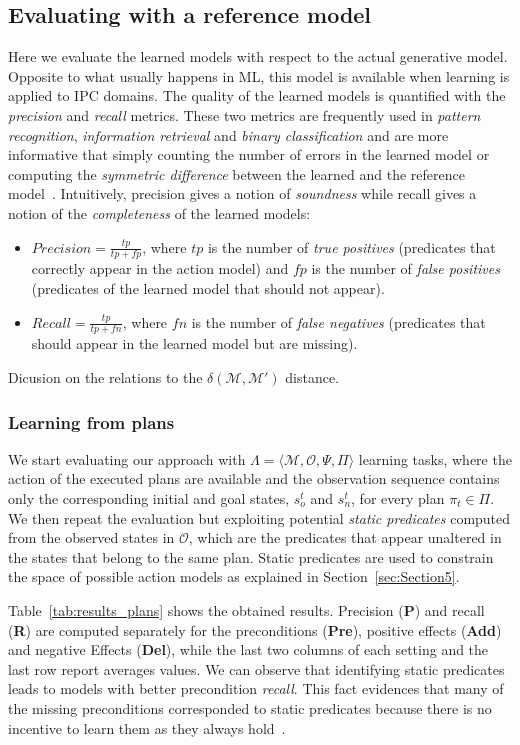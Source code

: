 \documentclass[3p,times]{elsarticle}
\newcommand{\tup}[1]{{\langle #1 \rangle}}
\begin{document}
\subsection{Evaluating with a reference model}
Here we evaluate the learned models with respect to the actual generative model. Opposite to what usually happens in ML, this model is available when learning is applied to IPC domains. The quality of the learned models is quantified with the {\em precision} and {\em recall} metrics. These two metrics are frequently used in {\em pattern recognition}, {\em information retrieval} and {\em binary classification} and are more informative that simply counting the number of errors in the learned model or computing the {\em symmetric difference} between the learned and the reference model~\cite{davis2006relationship}. Intuitively, precision gives a notion of {\em soundness} while recall gives a notion of the {\em completeness} of the learned models:
\begin{itemize}
\item $Precision=\frac{tp}{tp+fp}$, where $tp$ is the number of {\em true positives} (predicates that correctly appear in the action model) and $fp$ is the number of {\em false positives} (predicates of the learned model that should not appear).
\item $Recall=\frac{tp}{tp+fn}$, where $fn$ is the number of {\em false negatives} (predicates that should appear in the learned model but are missing).
\end{itemize}

Dicusion on the relations to the $\delta(\mathcal{M},\mathcal{M}')$ distance.


\subsubsection{Learning from plans}
We start evaluating our approach with $\Lambda=\tup{\mathcal{M},\mathcal{O},\Psi,\Pi}$ learning tasks, where the action of the executed plans are available and the observation sequence contains only the corresponding initial and goal states, $s_o^t$ and $s_n^t$, for every plan $\pi_t\in\Pi$. We then repeat the evaluation but exploiting potential \emph{static predicates} computed from the observed states in $\mathcal{O}$, which are the predicates that appear unaltered in the states that belong to the same plan. Static predicates are used to constrain the space of possible action models as explained in Section~\ref{sec:Section5}.

Table~\ref{tab:results_plans} shows the obtained results. Precision ({\bf P}) and recall ({\bf R}) are computed separately for the preconditions ({\bf Pre}), positive effects ({\bf Add}) and negative Effects ({\bf Del}), while the last two columns of each setting and the last row report averages values. We can observe that identifying static predicates leads to models with better precondition {\em recall}. This fact evidences that many of the missing preconditions corresponded to static predicates because there is no incentive to learn them as they always hold~\cite{gregory2015domain}.
\end{document}
